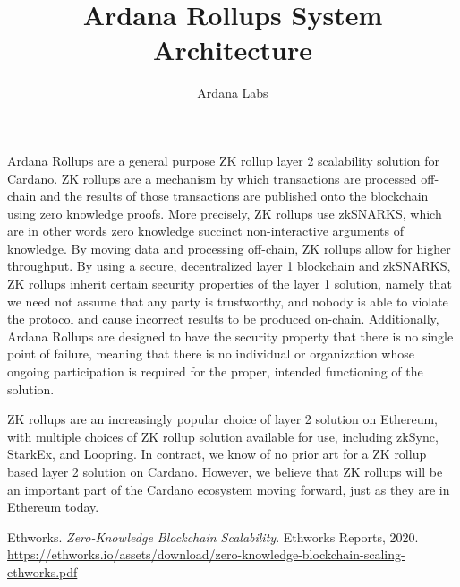 \documentclass[12pt]{article}
\title{Ardana Rollups System Architecture}
\author{Ardana Labs}
\begin{document}
\maketitle


Ardana Rollups are a general purpose ZK rollup layer 2 scalability solution for Cardano. ZK rollups are a mechanism by which transactions are processed off-chain and the results of those transactions are published onto the blockchain using zero knowledge proofs. More precisely, ZK rollups use zkSNARKS, which are in other words zero knowledge succinct non-interactive arguments of knowledge. By moving data and processing off-chain, ZK rollups allow for higher throughput. By using a secure, decentralized layer 1 blockchain and zkSNARKS, ZK rollups inherit certain security properties of the layer 1 solution, namely that we need not assume that any party is trustworthy, and nobody is able to violate the protocol and cause incorrect results to be produced on-chain. Additionally, Ardana Rollups are designed to have the security property that there is no single point of failure, meaning that there is no individual or organization whose ongoing participation is required for the proper, intended functioning of the solution.

ZK rollups are an increasingly popular choice of layer 2 solution on Ethereum, with multiple choices of ZK rollup solution available for use, including zkSync, StarkEx, and Loopring. \cite{ethworks-20} In contract, we know of no prior art for a ZK rollup based layer 2 solution on Cardano. However, we believe that ZK rollups will be an important part of the Cardano ecosystem moving forward, just as they are in Ethereum today.



\begin{thebibliography}{1}


		Ethworks. \textit{Zero-Knowledge Blockchain Scalability}. Ethworks Reports, 2020. \url{https://ethworks.io/assets/download/zero-knowledge-blockchain-scaling-ethworks.pdf}


\end{thebibliography}
\end{document}
